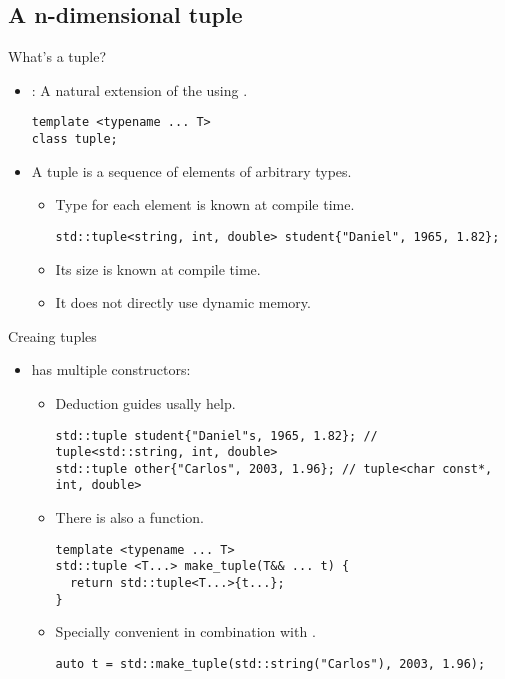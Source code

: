 \subsection{A n-dimensional tuple}

\begin{frame}[t,fragile]{What's a tuple?}
  \begin{itemize}
    \item {}: 
          A natural extension of the  using 
          .
\begin{lstlisting}
template <typename ... T>
class tuple;
\end{lstlisting}

    \item A tuple is a sequence of  elements of arbitrary types.
      \begin{itemize}
        \item Type for each element is known at compile time.
\begin{lstlisting}
std::tuple<string, int, double> student{"Daniel", 1965, 1.82};
\end{lstlisting}
        \item Its size is known at compile time.
        \item It does not directly use dynamic memory.
      \end{itemize}
  \end{itemize}
\end{frame}

\begin{frame}[t,fragile]{Creaing tuples}
  \begin{itemize}
    \item {} has multiple constructors:
      \begin{itemize}
        \item Deduction guides usally help.
\begin{lstlisting}
std::tuple student{"Daniel"s, 1965, 1.82}; // tuple<std::string, int, double>
std::tuple other{"Carlos", 2003, 1.96}; // tuple<char const*, int, double> 
\end{lstlisting}

        \item There is also a  function.
\begin{lstlisting}
template <typename ... T>
std::tuple <T...> make_tuple(T&& ... t) {
  return std::tuple<T...>{t...};
}
\end{lstlisting}
      \item Specially convenient in combination with .
\begin{lstlisting}
auto t = std::make_tuple(std::string("Carlos"), 2003, 1.96);
\end{lstlisting}
  \end{itemize}
\end{itemize}
\end{frame}
